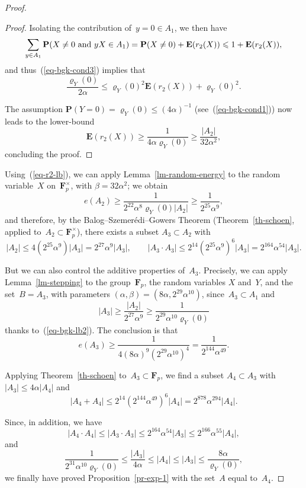 \documentclass[12pt]{amsart}
\renewcommand{\leq}{\leqslant}
\renewcommand{\geq}{\geqslant}
\numberwithin{equation}{section}
\newcommand{\Ff}{\mathbf{F}}
\newcommand{\proba}{\mathbf{P}}
\newcommand{\expect}{\mathbf{E}}
\renewcommand{\rho}{\varrho}
\theoremstyle{plain}
\theoremstyle{remark}
\theoremstyle{definition}
\renewcommand{\geq}{\geqslant}
\renewcommand{\leq}{\leqslant}
\begin{document}
\begin{proof}
\begin{proof}
    Isolating the contribution of~$y=0\in A_1$, we then have
    $$
    \sum_{y\in A_1}\proba(X\not=0\text{ and }
    yX\in A_1)=\proba(X\not=0)+\expect(r_2(X))\\
    \leq 1+\expect(r_2(X)),
    $$
    and thus~(\ref{eq-bgk-cond3}) implies that
    $$
    \frac{\rho_Y(0)}{2\alpha}\leq 
    \rho_Y(0)^2\expect(r_2(X))+\rho_Y(0)^2.
    $$
    
    The assumption $\proba(Y=0)=\rho_Y(0)\leq (4\alpha)^{-1}$
    (see~(\ref{eq-bgk-cond1})) now leads to the lower-bound
    $$
    \expect(r_2(X))\geq \frac{1}{4\alpha \rho_Y(0)}\geq
    \frac{|A_2|}{32\alpha^2},
    $$
    concluding the proof.
  \end{proof}
  
  Using~(\ref{eq-r2-lb}), we can apply Lemma~\ref{lm-random-energy} to
  the random variable~$X$ on~$\Ff_p^{\times}$, with $\beta=32\alpha^2$;
  we obtain
  $$
  e(A_2)\geq \frac{1}{2^{22}\alpha^8\rho_Y(0)|A_2|}\geq
  \frac{1}{2^{25}\alpha^9},
  $$
  and therefore, by the Balog--Szemerédi--Gowers Theorem
  (Theorem~\ref{th-schoen}, applied to~$A_2\subset \Ff_p^{\times}$),
  there exists a subset $A_3\subset A_2$ with
  $$
  |A_2|\leq 4(2^{25}\alpha^9)|A_3|=2^{27}\alpha^9|A_3|,\quad\quad
  |A_3\cdot A_3|\leq 2^{14}(2^{25}\alpha^9)^6 |A_3|=2^{164}\alpha^{54}|A_3|.
  $$

  But we can also control the additive properties of~$A_3$. Precisely,
  we can apply Lemma~\ref{lm-stepping} to the group~$\Ff_p$, the random
  variables $X$ and~$Y$, and the set~$B=A_3$, with parameters
  $(\alpha,\beta)=(8\alpha,2^{29}\alpha^{10})$, since~$A_3\subset A_1$
  and
  $$
  |A_3|\geq \frac{|A_2|}{2^{27}\alpha^9}\geq
  \frac{1}{2^{29}\alpha^{10}\rho_Y(0)}
  $$
  thanks to~(\ref{eq-bgk-lb2}). The conclusion is that
  $$
  e(A_3)\geq
  \frac{1}{4(8\alpha)^9(2^{29}\alpha^{10})^4}=\frac{1}{2^{144}\alpha^{49}}.
  $$

  Applying Theorem~\ref{th-schoen} to~$A_3 \subset \Ff_p$, we find a
  subset $A_4\subset A_3$ with $|A_3|\leq 4\alpha|A_4|$ and
  $$
  |A_4+A_4|\leq 2^{14}(2^{144}\alpha^{49})^6
  |A_4|=2^{878}\alpha^{294}|A_4|.
  $$

  Since, in addition, we have
  $$
  |A_4\cdot A_4|\leq |A_3\cdot A_3|\leq 2^{164}\alpha^{54}|A_3|\leq
  2^{166}\alpha^{55}|A_4|,
  $$
  and
  $$
  \frac{1}{2^{31}\alpha^{10}\rho_Y(0)}\leq \frac{|A_3|}{4\alpha}\leq
  |A_4|\leq |A_3|\leq \frac{8\alpha}{\rho_Y(0)},
  $$
  we finally have proved Proposition~\ref{pr-exp-1} with the set~$A$
  equal to~$A_4$.
\end{proof}
\end{document}
